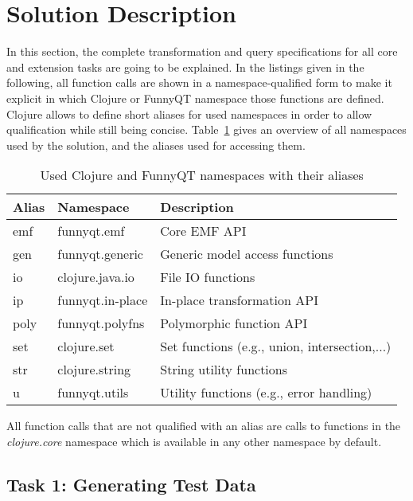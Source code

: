 \documentclass[a4paper]{article}
\begin{document}
\section{Solution Description}
\label{sec:solution-description}

In this section, the complete transformation and query specifications for all
core and extension tasks are going to be explained.  In the listings given in
the following, all function calls are shown in a namespace-qualified form to
make it explicit in which Clojure or FunnyQT namespace those functions are
defined.  Clojure allows to define short aliases for used namespaces in order
to allow qualification while still being concise.  Table~\ref{tab:namespaces}
gives an overview of all namespaces used by the solution, and the aliases used
for accessing them.

\begin{table}[h!t]
  \centering
  \begin{tabular}{| l | l | l |}
    \hline
    \textbf{Alias} & \textbf{Namespace} & \textbf{Description}\\
    \hline
    \textsf{emf}  & \textsf{funnyqt.emf}      & Core EMF API\\
    \textsf{gen}  & \textsf{funnyqt.generic}  & Generic model access functions\\
    \textsf{io}   & \textsf{clojure.java.io}  & File IO functions\\
    \textsf{ip}   & \textsf{funnyqt.in-place} & In-place transformation API\\
    \textsf{poly} & \textsf{funnyqt.polyfns}  & Polymorphic function API\\
    \textsf{set}  & \textsf{clojure.set}      & Set functions (e.g., union, intersection,...)\\
    \textsf{str}  & \textsf{clojure.string}   & String utility functions\\
    \textsf{u}    & \textsf{funnyqt.utils}    & Utility functions (e.g., error handling)\\
    \hline
  \end{tabular}
  \caption{Used Clojure and FunnyQT namespaces with their aliases}
  \label{tab:namespaces}
\end{table}

All function calls that are not qualified with an alias are calls to functions
in the \emph{clojure.core} namespace which is available in any other namespace
by default.

\subsection{Task 1: Generating Test Data}
\label{sec:task-1:generating-test-data}
\end{document}
